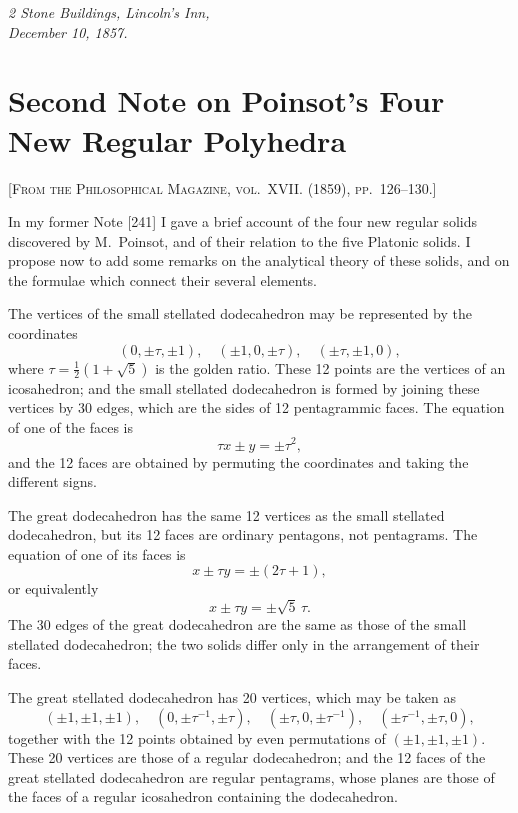 \documentclass[11pt,a4paper]{article}
\begin{document}
\medskip
\noindent\textit{2 Stone Buildings, Lincoln's Inn,\\December 10, 1857.}

\newpage



\section{Second Note on Poinsot's Four New Regular Polyhedra}

\textsc{[From the Philosophical Magazine, vol.~XVII. (1859), pp.~126--130.]}
\label{paper:242}

\setcounter{page}{86}

In my former Note [241] I gave a brief account of the four new regular solids discovered by M.~Poinsot, and of their relation to the five Platonic solids. I propose now to add some remarks on the analytical theory of these solids, and on the formulae which connect their several elements.

The vertices of the small stellated dodecahedron may be represented by the coordinates
\[
(0, \pm\tau, \pm1), \quad (\pm1, 0, \pm\tau), \quad (\pm\tau, \pm1, 0),
\]
where $\tau = \frac{1}{2}(1+\sqrt{5})$ is the golden ratio. These 12 points are the vertices of an icosahedron; and the small stellated dodecahedron is formed by joining these vertices by 30 edges, which are the sides of 12 pentagrammic faces. The equation of one of the faces is
\[
\tau x \pm y = \pm\tau^2,
\]
and the 12 faces are obtained by permuting the coordinates and taking the different signs.

\setcounter{page}{87}

The great dodecahedron has the same 12 vertices as the small stellated dodecahedron, but its 12 faces are ordinary pentagons, not pentagrams. The equation of one of its faces is
\[
x \pm \tau y = \pm(2\tau+1),
\]
or equivalently
\[
x \pm \tau y = \pm\sqrt{5}\,\tau.
\]
The 30 edges of the great dodecahedron are the same as those of the small stellated dodecahedron; the two solids differ only in the arrangement of their faces.

The great stellated dodecahedron has 20 vertices, which may be taken as
\[
(\pm1, \pm1, \pm1), \quad (0, \pm\tau^{-1}, \pm\tau), \quad (\pm\tau, 0, \pm\tau^{-1}), \quad (\pm\tau^{-1}, \pm\tau, 0),
\]
together with the 12 points obtained by even permutations of $(\pm1, \pm1, \pm1)$. These 20 vertices are those of a regular dodecahedron; and the 12 faces of the great stellated dodecahedron are regular pentagrams, whose planes are those of the faces of a regular icosahedron containing the dodecahedron.
\end{document}
